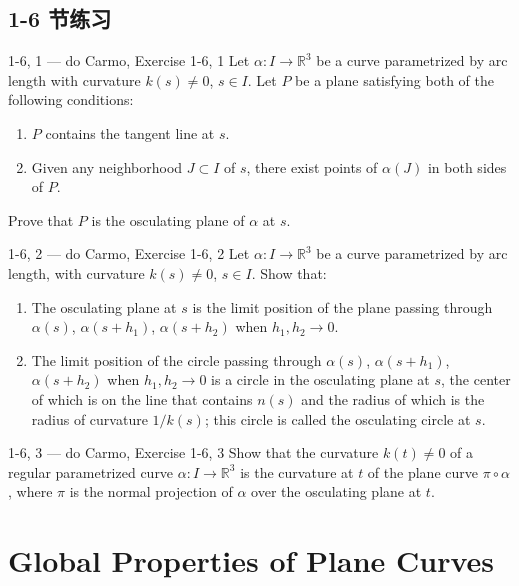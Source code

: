 \subsection*{1-6 节练习}

\begin{exercise}{1-6, 1 — do Carmo, Exercise 1-6, 1}
Let $\alpha: I \to \mathbb{R}^3$ be a curve parametrized by arc length with curvature $k(s) \neq 0$, $s \in I$. Let $P$ be a plane satisfying both of the following conditions:
\begin{enumerate}
\item $P$ contains the tangent line at $s$.
\item Given any neighborhood $J \subset I$ of $s$, there exist points of $\alpha(J)$ in both sides of $P$.
\end{enumerate}
Prove that $P$ is the osculating plane of $\alpha$ at $s$.
\end{exercise}

\begin{exercise}{1-6, 2 — do Carmo, Exercise 1-6, 2}
Let $\alpha: I \to \mathbb{R}^3$ be a curve parametrized by arc length, with curvature $k(s) \neq 0$, $s \in I$. Show that:
\begin{enumerate}
\item[a.] The osculating plane at $s$ is the limit position of the plane passing through $\alpha(s)$, $\alpha(s + h_1)$, $\alpha(s + h_2)$ when $h_1, h_2 \to 0$.
\item[b.] The limit position of the circle passing through $\alpha(s)$, $\alpha(s + h_1)$, $\alpha(s + h_2)$ when $h_1, h_2 \to 0$ is a circle in the osculating plane at $s$, the center of which is on the line that contains $n(s)$ and the radius of which is the radius of curvature $1/k(s)$; this circle is called the osculating circle at $s$.
\end{enumerate}
\end{exercise}

\begin{exercise}{1-6, 3 — do Carmo, Exercise 1-6, 3}
Show that the curvature $k(t) \neq 0$ of a regular parametrized curve $\alpha: I \to \mathbb{R}^3$ is the curvature at $t$ of the plane curve $\pi \circ \alpha$, where $\pi$ is the normal projection of $\alpha$ over the osculating plane at $t$.
\end{exercise}

\section{Global Properties of Plane Curves}\label{sec:global-properties-ch1}

